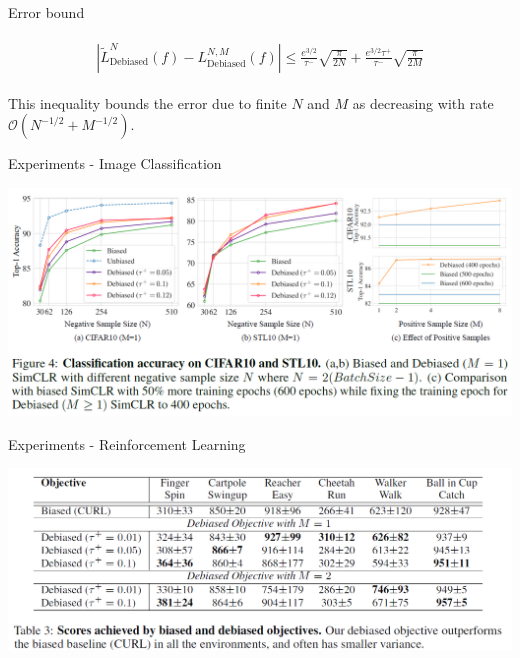 \documentclass[aspectratio=169,mathserif]{beamer}  %
\begin{document}
\begin{frame}{Error bound}

\begin{eqnarray}
\begin{aligned}
\left|\tilde{L}_{\text{Debiased}}^N(f)-L_{\text{Debiased}}^{N,M}(f)\right|\leq\frac{e^{3/2}}{\tau^-}\sqrt{\frac{\pi}{2N}}+\frac{e^{3/2}\tau^+}{\tau^-}\sqrt{\frac{\pi}{2M}}
\end{aligned}
\end{eqnarray}

This inequality bounds the error due to finite $N$ and $M$ as decreasing with rate $\mathcal{O}(N^{-1/2}+M^{-1/2})$.
    
\end{frame}



\begin{frame}{Experiments - Image Classification}

\begin{center}
    \includegraphics[width=\linewidth]{figure16.png}
\end{center}
    
\end{frame}




    



\begin{frame}{Experiments - Reinforcement Learning}

\begin{center}
    \includegraphics[width=\linewidth]{figure18.png}
\end{center}
    
\end{frame}
\end{document}
